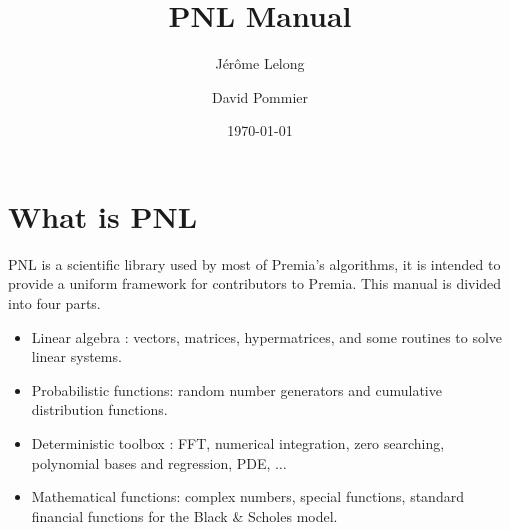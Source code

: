 \documentclass[a4paper,11pt,twoside]{article}
\title{PNL Manual}
\date{\today}
\author{J\'er\^ome Lelong \and  David Pommier}
\begin{document}
\maketitle
\tableofcontents

\section{What is PNL}

PNL is a scientific library used by most of Premia's algorithms, it is
intended to provide a uniform framework for contributors to Premia. This
manual is divided into four parts.
\begin{itemize}
\item Linear algebra : vectors, matrices, hypermatrices, and some
  routines to solve linear systems.
\item Probabilistic functions: random number generators and  cumulative
  distribution functions.
\item Deterministic toolbox : FFT, numerical integration, zero searching,
  polynomial bases and regression, PDE, $\dots$
\item Mathematical functions: complex numbers, special functions, standard
  financial functions for the Black \& Scholes model.
\end{itemize}











\printindex
\end{document}
